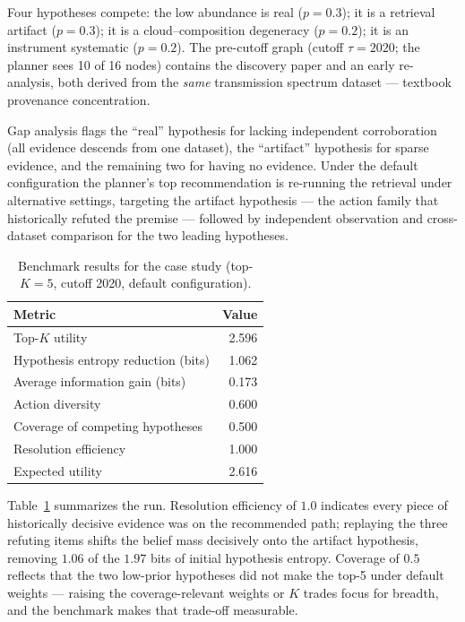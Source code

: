 \documentclass[11pt]{article}
\begin{document}
Four hypotheses compete: the low abundance is real ($p=0.3$); it is a
retrieval artifact ($p=0.3$); it is a cloud--composition degeneracy
($p=0.2$); it is an instrument systematic ($p=0.2$). The pre-cutoff
graph (cutoff $\tau = 2020$; the planner sees 10 of 16 nodes) contains
the discovery paper and an early re-analysis, both derived from the
\emph{same} transmission spectrum dataset --- textbook provenance
concentration.

Gap analysis flags the ``real'' hypothesis for lacking independent
corroboration (all evidence descends from one dataset), the ``artifact''
hypothesis for sparse evidence, and the remaining two for having no
evidence. Under the default configuration the planner's top
recommendation is re-running the retrieval under alternative settings,
targeting the artifact hypothesis --- the action family that historically
refuted the premise --- followed by independent observation and
cross-dataset comparison for the two leading hypotheses.

\begin{table}[t]
\centering
\caption{Benchmark results for the case study (top-$K{=}5$, cutoff 2020,
default configuration).}
\label{tab:results}
\begin{tabular}{lr}
\toprule
Metric & Value \\
\midrule
Top-$K$ utility & 2.596 \\
Hypothesis entropy reduction (bits) & 1.062 \\
Average information gain (bits) & 0.173 \\
Action diversity & 0.600 \\
Coverage of competing hypotheses & 0.500 \\
Resolution efficiency & 1.000 \\
Expected utility & 2.616 \\
\bottomrule
\end{tabular}
\end{table}

Table~\ref{tab:results} summarizes the run. Resolution efficiency of
$1.0$ indicates every piece of historically decisive evidence was on the
recommended path; replaying the three refuting items shifts the belief
mass decisively onto the artifact hypothesis, removing $1.06$ of the
$1.97$ bits of initial hypothesis entropy. Coverage of $0.5$ reflects
that the two low-prior hypotheses did not make the top-5 under default
weights --- raising the coverage-relevant weights or $K$ trades focus for
breadth, and the benchmark makes that trade-off measurable.
\end{document}
